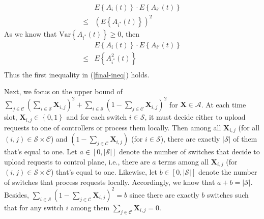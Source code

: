 \documentclass[10pt,journal,compsoc]{IEEEtran}
\begin{document}
\begin{equation}
	\begin{array}{cl}
		& E \left\{ A_{i}(t) \right\} \cdot E \left\{ A_{i'}(t) \right\} \\
		\le & \left( E\left\{ A_{i^*}(t) \right\} \right)^2
	\end{array}
\end{equation}
As we know that $\text{Var}\left\{ A_{i^*}(t) \right\} \ge 0$, then 
\begin{equation}
	\begin{array}{cl}
		& E \left\{ A_{i}(t) \right\} \cdot E \left\{ A_{i'}(t) \right\} \\
		\le & E \left\{ A^2_{i^*}(t) \right\} \\
	\end{array}
\end{equation}
Thus the first inequality in (\ref{final-ineq}) holds.  

Next, we focus on the upper bound of $\sum_{j \in \mathcal{C}} \left( \sum_{i \in \mathcal{S}} \mathbf{X}_{i,j} \right)^2 + \sum_{i \in \mathcal{S}} \left(1 - \sum_{j \in \mathcal{C}} \mathbf{X}_{i,j}\right)^2$ for $\mathbf{X} \in \mathcal{A}$.
At each time slot, $\mathbf{X}_{i,j} \in \left\{ 0, 1 \right\}$ and for each switch $i \in \mathcal{S}$, it must decide either to upload requests to one of controllers or process them locally. Then among all $\mathbf{X}_{i,j}$ (for all $(i,j) \in \mathcal{S} \times \mathcal{C}$) and $(1 - \sum_{j \in \mathcal{C}} \mathbf{X}_{i,j})$ (for $i \in \mathcal{S}$), there are exactly $|\mathcal{S}|$ of them that's equal to one. Let $a \in [0, |\mathcal{S}|]$ denote the number of switches that decide to upload requests to control plane, i.e., there are $a$ terms among all $\mathbf{X}_{i,j}$ (for $(i,j) \in \mathcal{S} \times \mathcal{C}$) that's equal to one.
Likewise, let $b \in [0, |\mathcal{S}|]$ denote the number of switches that process requests locally. Accordingly, we know that $a + b = |
\mathcal{S}|$. Besides, $\sum_{i \in \mathcal{S}} \left( 1 - \sum_{j \in \mathcal{C}} \mathbf{X}_{i,j} \right)^2 = b$ since there are exactly $b$ switches such that for any switch $i$ among them $\sum_{j \in \mathcal{C}} \mathbf{X}_{i,j} = 0$. 
\end{document}
